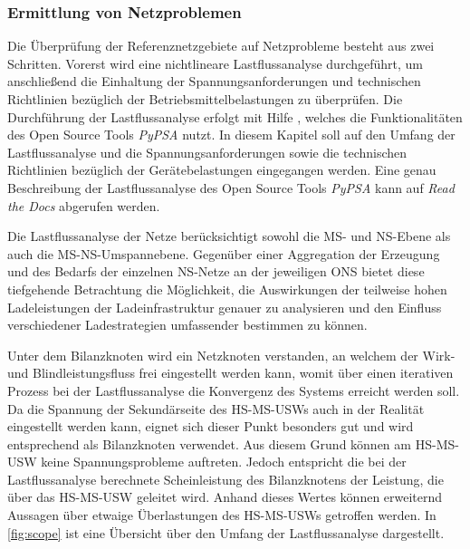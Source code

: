 \subsubsection{Ermittlung von Netzproblemen}\label{chap:grid_issues}

Die Überprüfung der Referenznetzgebiete auf Netzprobleme besteht aus zwei Schritten.
Vorerst wird eine nichtlineare Lastflussanalyse durchgeführt, um anschließend die Einhaltung der Spannungsanforderungen und technischen Richtlinien bezüglich der Betriebsmittelbelastungen zu überprüfen.
Die Durchführung der Lastflussanalyse erfolgt mit Hilfe , welches die Funktionalitäten des Open Source Tools \textit{PyPSA} \cite{Brown2020} nutzt.
In diesem Kapitel soll auf den Umfang der Lastflussanalyse und die Spannungsanforderungen sowie die technischen Richtlinien bezüglich der Gerätebelastungen eingegangen werden.
Eine genau Beschreibung der Lastflussanalyse des Open Source Tools \textit{PyPSA} kann auf \textit{Read the Docs} \cite{Brown2020a} abgerufen werden.



Die Lastflussanalyse der Netze berücksichtigt sowohl die \gls{MS}- und \gls{NS}-Ebene als auch die \gls{MS}-\gls{NS}-Umspannebene.
Gegenüber einer Aggregation der Erzeugung und des Bedarfs der einzelnen \gls{NS}-Netze an der jeweiligen \gls{ONS} bietet diese tiefgehende Betrachtung die Möglichkeit, die Auswirkungen der teilweise hohen Ladeleistungen der Ladeinfrastruktur genauer zu analysieren und den Einfluss verschiedener Ladestrategien umfassender bestimmen zu können.\medskip

Unter dem Bilanzknoten wird ein Netzknoten verstanden, an welchem der Wirk- und Blindleistungsfluss frei eingestellt werden kann, womit über einen iterativen Prozess bei der Lastflussanalyse die Konvergenz des Systems erreicht werden soll.
Da die Spannung der Sekundärseite des \gls{HS}-\gls{MS}-\glspl{USW} auch in der Realität eingestellt werden kann, eignet sich dieser Punkt besonders gut und wird entsprechend als Bilanzknoten verwendet.
Aus diesem Grund können am \gls{HS}-\gls{MS}-\gls{USW} keine Spannungsprobleme auftreten.
Jedoch entspricht die bei der Lastflussanalyse berechnete Scheinleistung des Bilanzknotens der Leistung, die über das \gls{HS}-\gls{MS}-\gls{USW} geleitet wird.
Anhand dieses Wertes können erweiternd Aussagen über etwaige Überlastungen des \gls{HS}-\gls{MS}-\glspl{USW} getroffen werden.
In \autoref{fig:scope} ist eine Übersicht über den Umfang der Lastflussanalyse dargestellt. \cite{Schachler}\medskip

